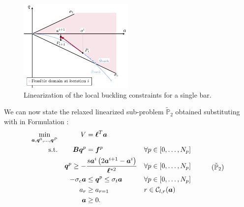 \begin{figure}
    \centering
    \includegraphics[width=0.5\textwidth]{figures/04_TTO_improvements/03_SLP/slp.pdf}
    \caption{ Linearization of the local buckling constraints for a single bar.}
    \label{fig:SLP}
\end{figure}


We can now state the relaxed linearized sub-problem $\tilde{\mathbb{P}}_2$ obtained substituting  with  in Formulation :
\begin{equation}
    \begin{aligned}
    \min_{\vect{a}, \vect{q}^0, \dots, \vect{q}^P}   && V &= \vect{\ell}^{T}\vect{a}\\
    \textrm{s.t.}   && \matr{B}\vect{q}^p &= \vect{f}^p && \forall p \in [0,\dots,N_p]\\
    && \vect{q}^p \geq - &\frac{s \vect{a}^i\left(2 \vect{a}^{i+1} - \vect{a}^i\right)}{\vect{\ell}^{*2}} && \forall p \in [0,\dots,N_p] \\
    && -\sigma_c\vect{a} &\leq \vect{q}^p \leq \sigma_t\vect{a} && \forall p \in [0,\dots,N_p] \\
    && a_{r}&\geq a_{r=1} && r \in \mathcal{C}_{l,r}(\vect{a}) \\
    && \vect{a} &\geq 0. \\
    \end{aligned}
    \tag{$\tilde{\mathbb{P}}_2$}
    \label{eq:optim_no_constr_lp}
\end{equation}

